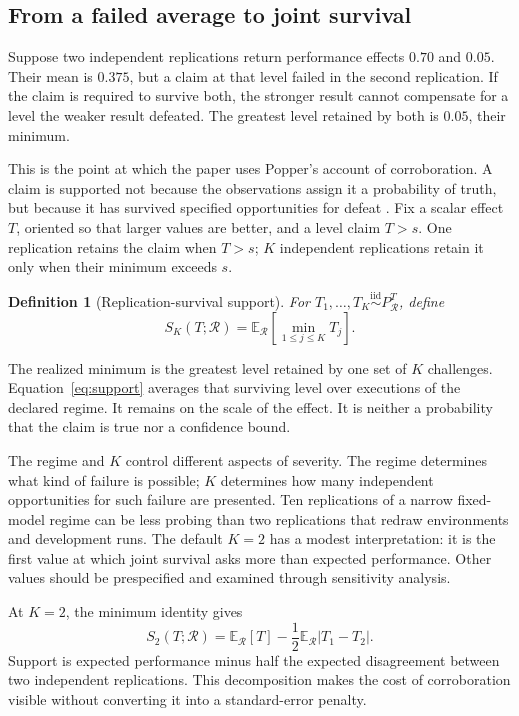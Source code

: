 \documentclass[11pt]{article}
\newcommand{\Regime}{\mathcal{R}}
\newcommand{\E}{\mathbb{E}}
\newcommand{\iid}{\mathrel{\overset{\mathrm{iid}}{\sim}}}
\newtheorem{definition}{Definition}
\theoremstyle{remark}
\begin{document}
\subsection{From a failed average to joint survival}

Suppose two independent replications return performance effects $0.70$ and $0.05$. Their mean is $0.375$, but a claim at that level failed in the second replication. If the claim is required to survive both, the stronger result cannot compensate for a level the weaker result defeated. The greatest level retained by both is $0.05$, their minimum.

This is the point at which the paper uses Popper's account of corroboration. A claim is supported not because the observations assign it a probability of truth, but because it has survived specified opportunities for defeat \cite{popper1959logic,popper1963conjectures}. Fix a scalar effect $T$, oriented so that larger values are better, and a level claim $T>s$. One replication retains the claim when $T>s$; $K$ independent replications retain it only when their minimum exceeds $s$.

\begin{definition}[Replication-survival support]
For $T_1,\ldots,T_K\iid P_{\Regime}^{T}$, define
\begin{equation}
S_K(T;\Regime)
=
\E_{\Regime}\left[
\min_{1\leq j\leq K}T_j
\right].
\label{eq:support}
\end{equation}
\end{definition}

The realized minimum is the greatest level retained by one set of $K$ challenges. Equation~\eqref{eq:support} averages that surviving level over executions of the declared regime. It remains on the scale of the effect. It is neither a probability that the claim is true nor a confidence bound.

The regime and $K$ control different aspects of severity. The regime determines what kind of failure is possible; $K$ determines how many independent opportunities for such failure are presented. Ten replications of a narrow fixed-model regime can be less probing than two replications that redraw environments and development runs. The default $K=2$ has a modest interpretation: it is the first value at which joint survival asks more than expected performance. Other values should be prespecified and examined through sensitivity analysis.

At $K=2$, the minimum identity gives
\begin{equation}
S_2(T;\Regime)
=
\E_{\Regime}[T]
-
\frac12\E_{\Regime}|T_1-T_2|.
\label{eq:k2}
\end{equation}
Support is expected performance minus half the expected disagreement between two independent replications. This decomposition makes the cost of corroboration visible without converting it into a standard-error penalty.
\end{document}
